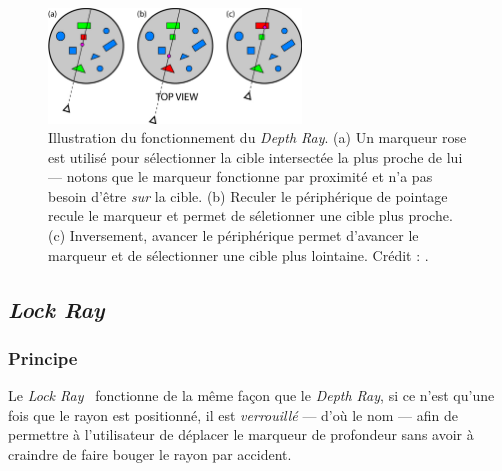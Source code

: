 	\newcommand{\rayWidth}{0.60\textwidth}
	\begin{figure}[!htb]
		\centering
		\includegraphics[width=\rayWidth]{figures/ch2/depthRay}
		\caption[Principe du \emph{Depth Ray}]{Illustration du fonctionnement du \emph{Depth Ray}. (a) Un marqueur rose est utilisé pour sélectionner la cible intersectée la plus proche de lui --- notons que le marqueur fonctionne par proximité et n'a pas besoin d'être \emph{sur} la cible. (b) Reculer le périphérique de pointage recule le marqueur et permet de séletionner une cible plus proche. (c) Inversement, avancer le périphérique permet d'avancer le marqueur et de sélectionner une cible plus lointaine. Crédit : \cite{grossman2006design}.}
		\label{fig:depthRay}
	\end{figure}
	
	\subsection{\emph{Lock Ray}}
	\subsubsection{Principe}
	Le \emph{Lock Ray}~\cite{grossman2006design} fonctionne de la même façon que le \emph{Depth Ray}, si ce n'est qu'une fois que le rayon est positionné, il est \emph{verrouillé} --- d'où le nom --- afin de permettre à l'utilisateur de déplacer le marqueur de profondeur sans avoir à craindre de faire bouger le rayon par accident.
	

